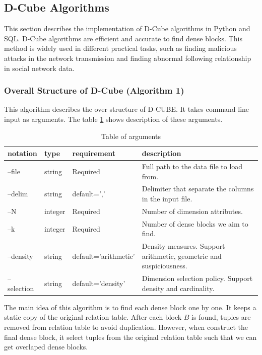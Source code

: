 \subsection{D-Cube Algorithms}
This section describes the implementation of D-Cube algorithms in Python and SQL. D-Cube algorithms are efficient and accurate to find dense blocks. This method is widely used in different practical tasks, such as finding malicious attacks in the network transmission and finding abnormal following relationship in social network data.

\subsubsection{Overall Structure of D-Cube (Algorithm 1)}
This algorithm describes the over structure of D-CUBE. It takes command line input as arguments. The table \ref{table:1} shows description of these arguments.
 
\begin{table}[h!]
\centering
\begin{tabular}{|p{2cm}|p{2cm}|p{4cm}|p{5cm}|}
 \hline
 notation & type & requirement & description \\ [0.5ex] 
 \hline\hline
 --file & string & Required & Full path to the data file to load from. \\ 
 --delim & string & default=',' & Delimiter that separate the columns in the input file. \\
 --N & integer & Required & Number of dimension attributes.\\
 --k & integer & Required & Number of dense blocks we aim to find. \\
 --density & string & default='arithmetic' & Density measures. Support arithmetic, geometric and suspiciousness. \\
 --selection & string & default='density' & Dimension selection policy. Support density and cardinality.\\ [1ex] 
 \hline
\end{tabular}
\caption{Table of arguments}
\label{table:1}
\end{table}

The main idea of this algorithm is to find each dense block one by one. It keeps a static copy of the original relation table. After each block $B$ is found, tuples are removed from relation table to avoid duplication. However, when construct the final dense block, it select tuples from the original relation table such that we can get overlaped dense blocks.


